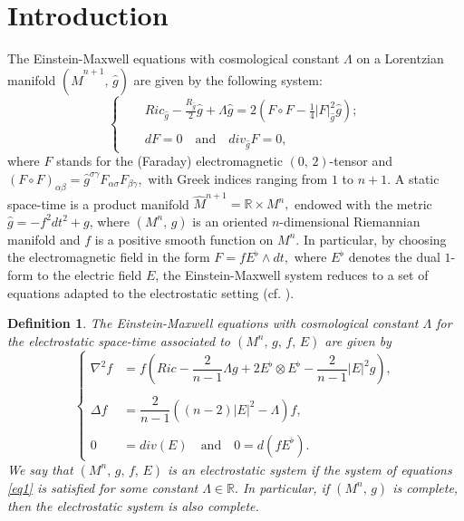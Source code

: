\documentclass{amsart}
\newtheorem{definition}{Definition}
\numberwithin{equation}{section}
\begin{document}
	\maketitle
	\tableofcontents
	\section{Introduction}
	
	
	
	
The Einstein-Maxwell equations with cosmological constant $\Lambda$ on a Lorentzian manifold $(\widehat{M}^{n+1},\,\hat{g})$ are given by the following system:
	\begin{equation}
		\left\{\begin{array}{rcll}
			&&{Ric}_{\hat{g}}-\frac{{R}_{\hat{g}}}{2}\hat{g} + \Lambda\hat{g} = 2\left(F\circ F -\frac{1}{4}|F|^2_{\hat{g}}\hat{g}\right);\nonumber\\\\
			&&dF=0\quad\mbox{and}\quad div_{\hat{g}} F=0,\nonumber
		\end{array}\right.
	\end{equation}
	where $F$ stands for the (Faraday) electromagnetic $(0,\,2)$-tensor and $(F\circ F)_{\alpha\beta} = \hat{g}^{\sigma\gamma}F_{\alpha\sigma}F_{\beta\gamma},$ with  Greek indices ranging from $1$ to $n+1$. A static space-time is a product manifold $\widehat{M}^{n+1}=\mathbb{R}\times M^{n},$ endowed with the metric $\hat{g}=-f^2dt^2+g$, where $(M^n,\,g)$ is an oriented $n$-dimensional Riemannian manifold and $f$ is a positive smooth function on $M^n.$ In particular, by choosing the electromagnetic field in the form $F=fE^{\flat}\wedge dt,$ where $E^{\flat}$ denotes the dual $1$-form to the electric field $E$, the Einstein-Maxwell system reduces to a set of equations adapted to the electrostatic setting (cf. \cite{chrusciel2017non,tiarlos,leandro2024}).
	
	\begin{definition}\label{def1}
		The Einstein-Maxwell equations with cosmological constant $\Lambda$ for the electrostatic space-time associated to $(M^n,\, g,\, f,\,E)$ are given by
\begin{equation}\label{eq1}
\left\{
\begin{aligned}
\nabla^2 f &= f \left( Ric - \dfrac{2}{n-1} \Lambda g + 2 E^\flat \otimes E^\flat - \dfrac{2}{n-1} |E|^2 g \right), \\\\
\Delta f &= \dfrac{2}{n-1} \left( (n-2)|E|^2 - \Lambda \right) f, \\\\
0 &= div(E) \quad \text{and} \quad 0 = d(f E^\flat).
\end{aligned}
\right.
\end{equation}
We say that $(M^n,\, g,\, f,\,E)$ is an electrostatic system if the system of equations \eqref{eq1} is satisfied for some constant $\Lambda\in\mathbb{R}.$ In particular, if $(M^n,\,g)$ is complete, then the electrostatic system is also complete.
	\end{definition}
	
\end{document}

